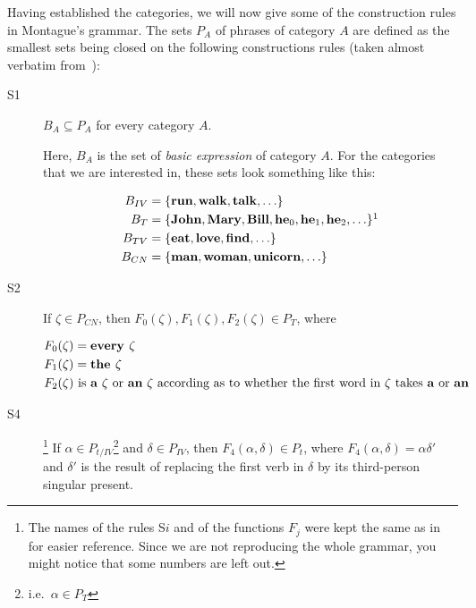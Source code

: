 Having established the categories, we will now give some of the
construction rules in Montague's grammar. The sets $P_A$ of phrases of
category $A$ are defined as the smallest sets being closed on the following
constructions rules (taken almost verbatim from~\cite{montague1973proper}):

\begin{description}
\item[S1] $B_A \subseteq P_A$ for every category $A$.

  Here, $B_A$ is the set of \emph{basic expression} of category $A$. For
  the categories that we are interested in, these sets look something like
  this:

  \begin{align*}
    B_{IV} &= \{ \textbf{run}, \textbf{walk}, \textbf{talk}, \ldots \} \\
    B_{T} &= \{ \textbf{John}, \textbf{Mary}, \textbf{Bill}, \textbf{he}_0,
            \textbf{he}_1, \textbf{he}_2, \ldots \}\footnotemark \\
    B_{TV} &= \{ \textbf{eat}, \textbf{love}, \textbf{find}, \ldots \} \\
    B_{CN} &= \{ \textbf{man}, \textbf{woman}, \textbf{unicorn}, \ldots \}
  \end{align*}


\item[S2] If $\zeta \in P_{CN}$, then
  $F_0(\zeta), F_1(\zeta), F_2(\zeta) \in P_{T}$, where

  \begin{align*}
    F_0(\zeta) &= \textbf{every } \zeta \\
    F_1(\zeta) &= \textbf{the } \zeta \\
    F_2(\zeta) &\text{ is \textbf{a} $\zeta$ or \textbf{an} $\zeta$ according
    as to whether the first word in $\zeta$ takes \textbf{a} or \textbf{an}}
  \end{align*}

\item[S4]\footnote{The names of the rules S$i$ and of the functions $F_j$
    were kept the same as in~\cite{montague1973proper} for easier
    reference. Since we are not reproducing the whole grammar, you might
    notice that some numbers are left out.} If
  $\alpha \in P_{t / IV}$\footnote{i.e.\ $\alpha \in P_{T}$} and
  $\delta \in P_{IV}$, then $F_4(\alpha, \delta) \in P_{t}$, where
  $F_4(\alpha, \delta) = \alpha \delta'$ and $\delta'$ is the result of
  replacing the first verb in $\delta$ by its third-person singular
  present.


\end{description}
